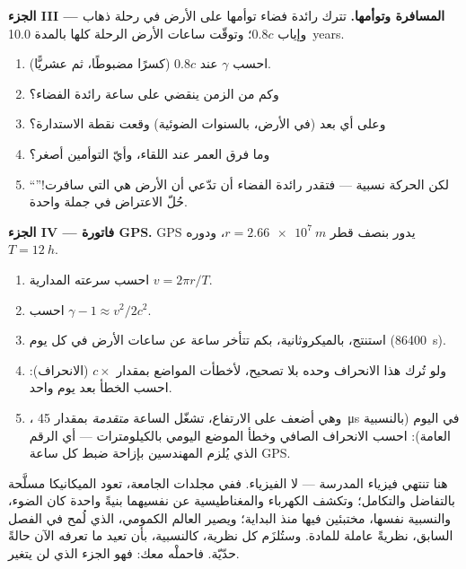 \begin{problem}
\medskip
\noindent\textbf{الجزء III --- المسافرة وتوأمها.}
تترك رائدة فضاء توأمها على الأرض في رحلة ذهاب وإياب  $0.8c$؛ وتوقّت
ساعات الأرض الرحلة كلها بالمدة \qty{10.0}{years}.
\begin{enumerate}[resume]
  \item احسب $\gamma$ عند $0.8c$ (كسرًا مضبوطًا، ثم عشريًّا).
  \item وكم من الزمن ينقضي على ساعة رائدة الفضاء؟
  \item وعلى أي بعد (في  الأرض، بالسنوات الضوئية) وقعت نقطة الاستدارة؟
  \item وما فرق العمر عند اللقاء، وأيّ التوأمين أصغر؟
  \item ``لكن الحركة نسبية --- فتقدر رائدة الفضاء أن تدّعي أن الأرض هي التي
        سافرت!'' حُلّ الاعتراض في جملة واحدة.
\end{enumerate}

\medskip
\noindent\textbf{الجزء IV --- فاتورة GPS.}
 GPS يدور بنصف قطر $r = \qty{2.66e7}{m}$، ودوره $T = \qty{12}{h}$.
\begin{enumerate}[resume]
  \item احسب سرعته المدارية $v = 2\pi r/T$.
  \item احسب $\gamma - 1 \approx v^2/2c^2$.
  \item استنتج، بالميكروثانية، بكم تتأخر ساعة  عن
        ساعات الأرض في كل يوم (\qty{86400}{s}).
  \item ولو تُرك هذا الانحراف وحده بلا تصحيح، لأخطأت المواضع بمقدار
        $c \times$ (الانحراف): احسب الخطأ بعد يوم واحد.
  \item {}، وهي أضعف على الارتفاع، تشغّل الساعة \emph{متقدمة} بمقدار
        \qty{45}{\micro s} في اليوم (بالنسبية العامة): احسب الانحراف
        الصافي وخطأ الموضع اليومي بالكيلومترات --- أي الرقم
        الذي يُلزم المهندسين بإزاحة ضبط كل ساعة GPS.
\end{enumerate}
\end{problem}

\bigskip
\noindent
هنا تنتهي فيزياء المدرسة --- لا الفيزياء. ففي مجلدات
الجامعة، تعود الميكانيكا مسلَّحة بالتفاضل والتكامل؛ وتكشف الكهرباء والمغناطيسية
عن نفسيهما بنيةً واحدة كان الضوء، والنسبية نفسها،
مختبئين فيها منذ البداية؛ ويصير العالم الكمومي، الذي لُمح في الفصل السابق،
نظريةً عاملة للمادة. وستُلزَم كل نظرية، كالنسبية، بأن
تعيد ما تعرفه الآن حالةً حدّيّة. فاحملْه معك: فهو
الجزء الذي لن يتغير.
